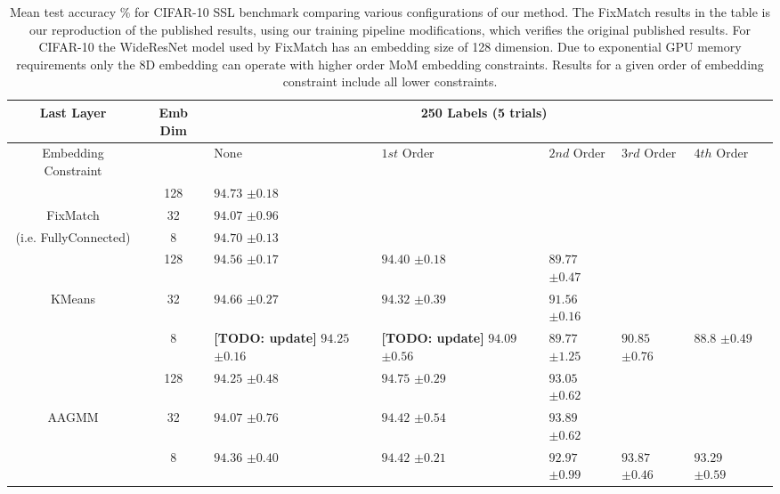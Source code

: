 \documentclass[10pt,twocolumn,letterpaper]{article}
\newcommand{\TODO}[1]{\textbf{\color{red}[TODO: #1]}}
\begin{document}
\begin{table*}[ht!]
\begin{tabularx}{\textwidth}{c|c|XXXXXX}
		\hline\hline
		Last Layer  &   Emb Dim  & \multicolumn{5}{c}{250 Labels (5 trials)}            \\ 
		\hline
		\multicolumn{1}{c|}{Embedding Constraint} &  & None & $1st$ Order & $2nd$ Order & $3rd$ Order & $4th$ Order  \\ 
		\hline
		& 128  & $94.73$ \scriptsize{$\pm 0.18$}   &  &  &  &   \\
		FixMatch\cite{sohn2020fixmatch} & 32  & $94.07$ \scriptsize{$\pm 0.96$}    &  &  &  &   \\
		(i.e. FullyConnected) & 8  & $94.70$ \scriptsize{$\pm 0.13$}      &  &  &  &   \\
		\hline
		& 128  & $94.56$ \scriptsize{$\pm 0.17$}    & $94.40$ \scriptsize{$\pm 0.18$} & $89.77$ \scriptsize{$\pm 0.47$} &  &  \\
		KMeans & 32  & $94.66$ \scriptsize{$\pm 0.27$}    & $94.32$ \scriptsize{$\pm 0.39$} & $91.56$ \scriptsize{$\pm 0.16$} &  &  \\
		& 8  & \TODO {update} $94.25$ \scriptsize{$\pm 0.16$}    & \TODO {update} $94.09$ \scriptsize{$\pm 0.56$} & $89.77$ \scriptsize{$\pm 1.25$} & $90.85$ \scriptsize{$\pm 0.76$} & $88.8$ \scriptsize{$\pm 0.49$}  \\
		\hline
		& 128  & $94.25$ \scriptsize{$\pm 0.48$}    & $\boldsymbol{94.75}$ \scriptsize{$\pm 0.29$} & $93.05$ \scriptsize{$\pm 0.62$} &  &  \\
		AAGMM  & 32  & $94.07$ \scriptsize{$\pm 0.76$}    & $94.42$ \scriptsize{$\pm 0.54$} & $93.89$ \scriptsize{$\pm 0.62$} &  &  \\
		& 8  & $94.36$ \scriptsize{$\pm 0.40$}    & $94.42$ \scriptsize{$\pm 0.21$} & $92.97$ \scriptsize{$\pm 0.99$} & $93.87$ \scriptsize{$\pm 0.46$} & $93.29$ \scriptsize{$\pm 0.59$} \\
	\end{tabularx}
	\caption{Mean test accuracy \% for CIFAR-10 SSL benchmark comparing various configurations of our method. The FixMatch results in the table is our reproduction of the published results, using our training pipeline modifications, which verifies the original published results. For CIFAR-10 the WideResNet model used by FixMatch has an embedding size of 128 dimension. Due to exponential GPU memory requirements only the 8D embedding can operate with higher order MoM embedding constraints. Results for a given order of embedding constraint include all lower constraints.}
	\label{table1}
\end{table*}
\end{document}
